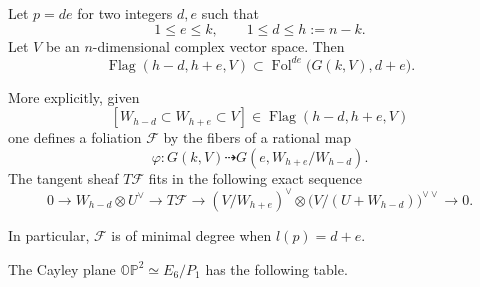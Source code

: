 \begin{theorem}
Let $p=de$ for two integers $d,e$ such
that
$$
1\leq e\leq k,
\qquad
1\leq d\leq h:=n-k.
$$
Let $V$ be an $n$-dimensional complex
vector space.
Then
$$
\operatorname{Flag}(h-d,h+e,V)
\subset
\operatorname{Fol}^{de}
\bigl(G(k,V),d+e\bigr).
$$

More explicitly, given
$$
[W_{h-d}\subset W_{h+e}\subset V]
\in
\operatorname{Flag}(h-d,h+e,V)
$$
one defines a foliation $\mathcal{F}$ by
the fibers of a rational map
$$
\varphi\colon
G(k,V)\dashrightarrow
G(e,W_{h+e}/W_{h-d}).
$$
The tangent sheaf $T\mathcal{F}$ fits in
the following exact sequence
$$
0\longrightarrow
W_{h-d}\otimes U^\vee
\longrightarrow
T\mathcal{F}
\longrightarrow
(V/W_{h+e})^\vee
\otimes
\bigl(V/(U+W_{h-d})\bigr)^{\vee\vee}
\longrightarrow 0.
$$

In particular, $\mathcal{F}$ is of
minimal degree when $l(p)=d+e$.
\end{theorem}

The Cayley plane
$\mathbb{OP}^2\simeq E_6/P_1$
has the following table.


